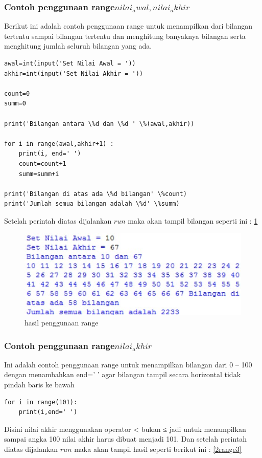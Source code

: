 \subsubsection{Contoh penggunaan range\(nilai_awal,nilai_akhir\)}
Berikut ini adalah contoh penggunaan range untuk menampilkan dari bilangan tertentu sampai bilangan tertentu dan menghitung banyaknya bilangan serta menghitung jumlah seluruh bilangan yang ada.
\begin{verbatim}
awal=int(input('Set Nilai Awal = '))
akhir=int(input('Set Nilai Akhir = '))

count=0
summ=0

print('Bilangan antara \%d dan \%d ' \%(awal,akhir))

for i in range(awal,akhir+1) :
	print(i, end=' ')
	count=count+1
	summ=summ+i

print('Bilangan di atas ada \%d bilangan' \%count)
print('Jumlah semua bilangan adalah \%d' \%summ)
\end{verbatim}

Setelah perintah diatas dijalankan \(run\) maka akan tampil bilangan seperti ini :
\ref{2range2}

\begin{figure}[ht]
    \centerline{\includegraphics[width=1\textwidth]{figures/2range2.JPG}}
    \caption{hasil penggunaan range}
    \label{2range2}
    \end{figure}
    
\subsubsection{Contoh penggunaan range\(nilai_akhir\)}
Ini adalah contoh penggunaan range untuk menampilkan bilangan dari 0 – 100 dengan menambahkan end=’ ’ agar bilangan tampil secara horizontal tidak pindah baris ke bawah
\begin{verbatim}
for i in range(101):
	print(i,end=' ')
\end{verbatim}
Disini nilai akhir menggunakan operator < bukan ≤ jadi untuk menampilkan sampai angka 100 nilai akhir harus dibuat menjadi 101. Dan setelah perintah diatas dijalankan \(run\) maka akan tampil hasil seperti berikut ini :
\ref{2range3}

